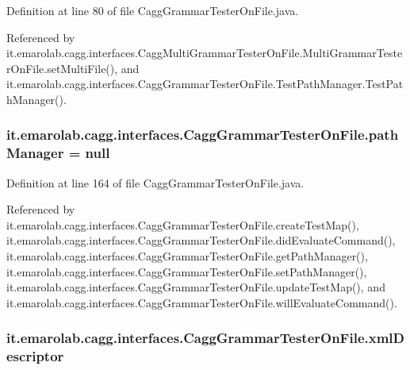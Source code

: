 Definition at line 80 of file Cagg\-Grammar\-Tester\-On\-File.\-java.



Referenced by it.\-emarolab.\-cagg.\-interfaces.\-Cagg\-Multi\-Grammar\-Tester\-On\-File.\-Multi\-Grammar\-Tester\-On\-File.\-set\-Multi\-File(), and it.\-emarolab.\-cagg.\-interfaces.\-Cagg\-Grammar\-Tester\-On\-File.\-Test\-Path\-Manager.\-Test\-Path\-Manager().

\hypertarget{classit_1_1emarolab_1_1cagg_1_1interfaces_1_1CaggGrammarTesterOnFile_a9ec5e0710fd9124f63294f5596d38a3e}{
\subsubsection[{path\-Manager}]{ it.\-emarolab.\-cagg.\-interfaces.\-Cagg\-Grammar\-Tester\-On\-File.\-path\-Manager = null\hspace{0.3cm}{\ttfamily [private]}}}\label{classit_1_1emarolab_1_1cagg_1_1interfaces_1_1CaggGrammarTesterOnFile_a9ec5e0710fd9124f63294f5596d38a3e}


Definition at line 164 of file Cagg\-Grammar\-Tester\-On\-File.\-java.



Referenced by it.\-emarolab.\-cagg.\-interfaces.\-Cagg\-Grammar\-Tester\-On\-File.\-create\-Test\-Map(), it.\-emarolab.\-cagg.\-interfaces.\-Cagg\-Grammar\-Tester\-On\-File.\-did\-Evaluate\-Command(), it.\-emarolab.\-cagg.\-interfaces.\-Cagg\-Grammar\-Tester\-On\-File.\-get\-Path\-Manager(), it.\-emarolab.\-cagg.\-interfaces.\-Cagg\-Grammar\-Tester\-On\-File.\-set\-Path\-Manager(), it.\-emarolab.\-cagg.\-interfaces.\-Cagg\-Grammar\-Tester\-On\-File.\-update\-Test\-Map(), and it.\-emarolab.\-cagg.\-interfaces.\-Cagg\-Grammar\-Tester\-On\-File.\-will\-Evaluate\-Command().

\hypertarget{classit_1_1emarolab_1_1cagg_1_1interfaces_1_1CaggGrammarTesterOnFile_ae37c531553e39bd42b44cda4dd95cb05}{
\subsubsection[{xml\-Descriptor}]{ it.\-emarolab.\-cagg.\-interfaces.\-Cagg\-Grammar\-Tester\-On\-File.\-xml\-Descriptor\hspace{0.3cm}{\ttfamily [private]}}}\label{classit_1_1emarolab_1_1cagg_1_1interfaces_1_1CaggGrammarTesterOnFile_ae37c531553e39bd42b44cda4dd95cb05}


